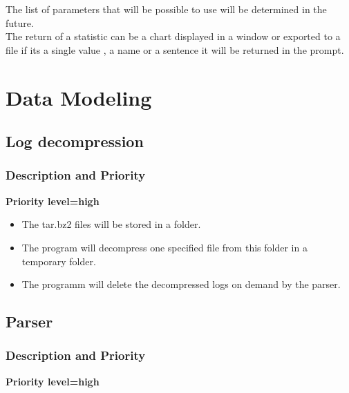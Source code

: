 \documentclass{scrreprt}
\begin{document}
The list of parameters that will be possible to use will be determined in the
future.\\
The return of a statistic can be a chart displayed in a window or exported to a
file if its a single value , a name or a sentence it will be returned in the prompt.
\section{Data Modeling}

\subsection{Log decompression}
\subsubsection{Description and Priority}
\textbf{Priority level=high}\\


\begin{itemize}
  \item The tar.bz2 files will be stored in a folder.
  \item The program will decompress one specified file from this folder in a temporary folder.
  \item The programm will delete the decompressed logs on demand by the parser.
\end{itemize}

\subsection{Parser}

\subsubsection{Description and Priority}

\textbf{Priority level=high}\\
\end{document}
